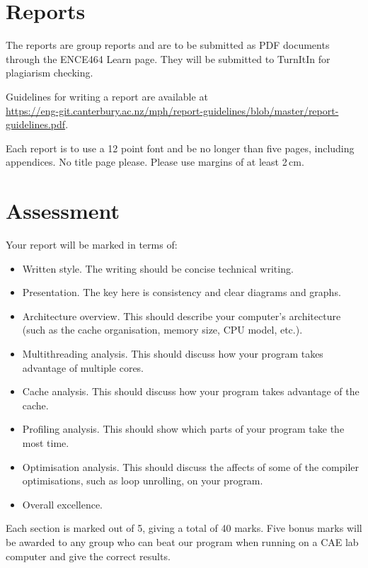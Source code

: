 \documentclass[a4paper,11pt]{article}
\begin{document}
\section{Reports}

The reports are group reports and are to be submitted as PDF documents
through the ENCE464 Learn page.  They will be submitted to TurnItIn
for plagiarism checking.

Guidelines for writing a report are available at\\
\url{https://eng-git.canterbury.ac.nz/mph/report-guidelines/blob/master/report-guidelines.pdf}.

Each report is to use a 12 point font and be no longer than five
pages, including appendices.  No title page please.  Please use
margins of at least 2\,cm.


\section{Assessment}

Your report will be marked in terms of:
%
\begin{itemize}
\item Written style.  The writing should be concise technical writing.
\item Presentation.  The key here is consistency and clear diagrams
  and graphs.
\item Architecture overview.  This should describe your computer's
  architecture (such as the cache organisation, memory size, CPU model,
  etc.).
\item Multithreading analysis.  This should discuss how your program
  takes advantage of multiple cores.
\item Cache analysis.  This should discuss how your program takes
  advantage of the cache.
\item Profiling analysis.  This should show which parts of your
  program take the most time.
\item Optimisation analysis.  This should discuss the affects of some
  of the compiler optimisations, such as loop unrolling, on your
  program.
\item Overall excellence.
\end{itemize}
%
Each section is marked out of 5, giving a total of 40 marks.  Five
bonus marks will be awarded to any group who can beat our program when
running on a CAE lab computer and give the correct results.
\end{document}
